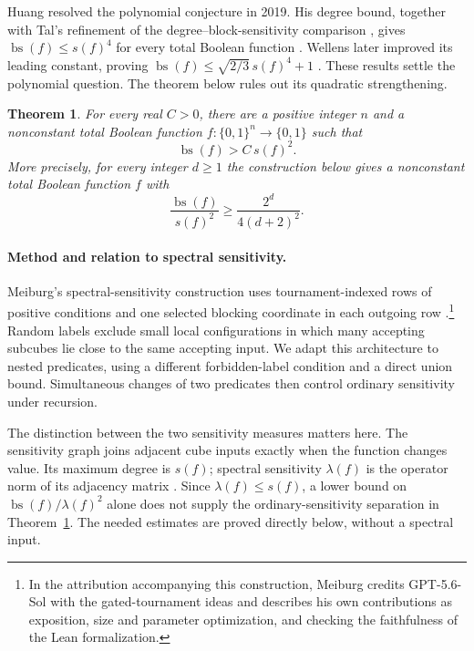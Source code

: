 \documentclass[11pt]{article}
\newcommand{\bs}{\operatorname{bs}}
\newtheorem{theorem}{Theorem}[section]
\theoremstyle{definition}
\theoremstyle{remark}
\begin{document}
Huang resolved the polynomial conjecture in 2019. His degree bound,
together with Tal's refinement of the degree--block-sensitivity comparison
\cite{Tal2013}, gives \(\bs(f)\le s(f)^4\) for every total Boolean function
\cite[Theorem~1.5]{Huang2019}. Wellens later improved its leading constant,
proving
\(\bs(f)\le\sqrt{2/3}\,s(f)^4+1\)
\cite[Corollary~4.2]{Wellens2022}.
These results settle the polynomial question. The theorem below rules out
its quadratic strengthening.

\begin{theorem}\label{thm:main}
For every real \(C>0\), there are a positive integer \(n\) and a
nonconstant total Boolean function \(f:\{0,1\}^n\to\{0,1\}\) such that
\[
 \bs(f)>C\,s(f)^2.
\]
More precisely, for every integer \(d\ge1\) the construction below gives
a nonconstant total Boolean function \(f\) with
\[
 \frac{\bs(f)}{s(f)^2}\ge \frac{2^d}{4(d+2)^2}.
\]
\end{theorem}

\paragraph{Method and relation to spectral sensitivity.}
Meiburg's spectral-sensitivity construction uses tournament-indexed rows
of positive conditions and one selected blocking coordinate in each
outgoing row \cite[Sections~3.1 and~5.2--5.5]{Meiburg2026}.\footnote{In the
attribution accompanying this construction, Meiburg credits GPT-5.6-Sol
with the gated-tournament ideas and describes his own contributions as
exposition, size and parameter optimization, and checking the faithfulness
of the Lean formalization.}
Random labels exclude small local configurations in which many accepting
subcubes lie close to the same accepting input. We adapt this architecture
to nested predicates, using a different forbidden-label condition and a
direct union bound. Simultaneous changes of two predicates then control
ordinary sensitivity under recursion.

The distinction between the two sensitivity measures matters here.
The sensitivity graph joins adjacent cube inputs exactly when the function
changes value. Its maximum degree is \(s(f)\); spectral sensitivity
\(\lambda(f)\) is the operator norm of its adjacency matrix
\cite{AaronsonEtAl2021}.
Since \(\lambda(f)\le s(f)\), a lower bound on
\(\bs(f)/\lambda(f)^2\) alone does not supply the ordinary-sensitivity
separation in Theorem~\ref{thm:main}.
The needed estimates are proved directly below, without a spectral input.
\end{document}
